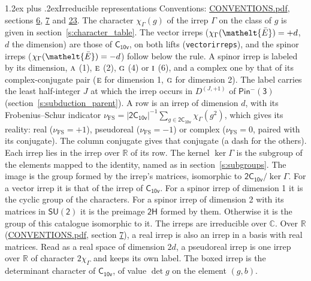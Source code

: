 \documentclass[10pt,a4paper]{article}
\makeatletter
\renewcommand\section{\@startsection{section}{1}{\z@}{-3ex plus -1ex minus -.2ex}%
  {1.2ex plus .2ex}{\normalfont\large\sffamily\bfseries\color{parttitle}}}
\numberwithin{equation}{section}
\newcommand{\eltfont}[1]{{\let\sigma\eltsigma\mathelt{#1}}}
\newcommand{\grp}[1]{\mathsf{#1}}
\newcommand{\irr}[1]{\text{\normalfont\scshape #1}}
\newcommand{\elt}[1]{\eltfont{#1}}
\newcommand{\irrJp}[2]{D^{(#1,#2)}}
\newcommand{\irchar}[1]{\chi_{#1}}
\newcommand{\fsind}{\nu_{\mathrm{FS}}}
\newcommand{\barred}[1]{\bar{#1}}
\makeatother
\begin{document}
\section{Irreducible representations}\label{s:irreps}
Conventions: \href{../../CONVENTIONS.pdf}{CONVENTIONS.pdf}, sections \href{../../../rotation/CONVENTIONS.pdf\#conv.6}{6}, \href{../../../rotation/CONVENTIONS.pdf\#conv.7}{7} and \href{../../CONVENTIONS.pdf\#conv.23}{23}.
\leavevmode\label{n:function.character}\label{n:irrep.Gamma}The character $\irchar{\Gamma}(g)$ of the irrep $\Gamma$ on the class of $g$ is given in section~\ref{s:character_table}. \label{n:index.dimension}The vector irreps ($\irchar{\Gamma}(\elt{\barred{E}}) = +d$, $d$ the dimension) are those of \href{../../../rotation/data/pdf/C10v.pdf}{$\grp{C_{10v}}$}, on both lifts (\texttt{vectorirreps}), and the spinor irreps ($\irchar{\Gamma}(\elt{\barred{E}}) = -d$) follow below the rule. A spinor irrep is labeled by its dimension, $\irr{a}$ (1), $\irr{e}$ (2), $\irr{g}$ (4) or $\irr{i}$ (6), and a complex one by that of its complex-conjugate pair ($\irr{e}$ for dimension 1, $\irr{g}$ for dimension 2). The label carries the least half-integer $J$ at which the irrep occurs in $\irrJp{J}{+1}$ of $\grp{Pin^{-}(3)}$ (section~\ref{s:subduction_parent}).
\leavevmode\label{n:index.frobenius}\label{n:head.irrep}\label{n:head.reality}A row is an irrep of dimension $d$, with its Frobenius--Schur indicator $\fsind = |\grp{2C_{10v}}|^{-1}\allowbreak\sum_{g\in\grp{2C_{10v}}}\irchar{\Gamma}(g^2)$, which gives its reality: real ($\fsind = +1$), pseudoreal ($\fsind = -1$) or complex ($\fsind = 0$, paired with its conjugate). \label{n:head.conjugate}The column conjugate gives that conjugate (a dash for the others). \label{n:head.over.real}Each irrep lies in the irrep over $\mathbb{R}$ of its row. \label{n:head.kernel}The kernel $\ker\Gamma$ is the subgroup of the elements mapped to the identity, named as in section~\ref{s:subgroups}. \label{n:head.image}The image is the group formed by the irrep's matrices, isomorphic to $\grp{2C_{10v}}/\ker\Gamma$. For a vector irrep it is that of the irrep of \href{../../../rotation/data/pdf/C10v.pdf}{$\grp{C_{10v}}$}. For a spinor irrep of dimension 1 it is the cyclic group of the characters. For a spinor irrep of dimension 2 with its matrices in $\grp{SU(2)}$ it is the preimage $\grp{2H}$ formed by them. Otherwise it is the group of this catalogue isomorphic to it. The irreps are irreducible over $\mathbb{C}$. Over $\mathbb{R}$ (\href{../../CONVENTIONS.pdf}{CONVENTIONS.pdf}, section \href{../../../rotation/CONVENTIONS.pdf\#conv.7}{7}), a real irrep is also an irrep in a basis with real matrices. Read as a real space of dimension $2d$, a pseudoreal irrep is one irrep over $\mathbb{R}$ of character $2\irchar{\Gamma}$ and keeps its own label. \label{n:mark.determinant}The boxed irrep is the determinant character of \href{../../../rotation/data/pdf/C10v.pdf}{$\grp{C_{10v}}$}, of value $\det g$ on the element $(g, b)$.
\end{document}
